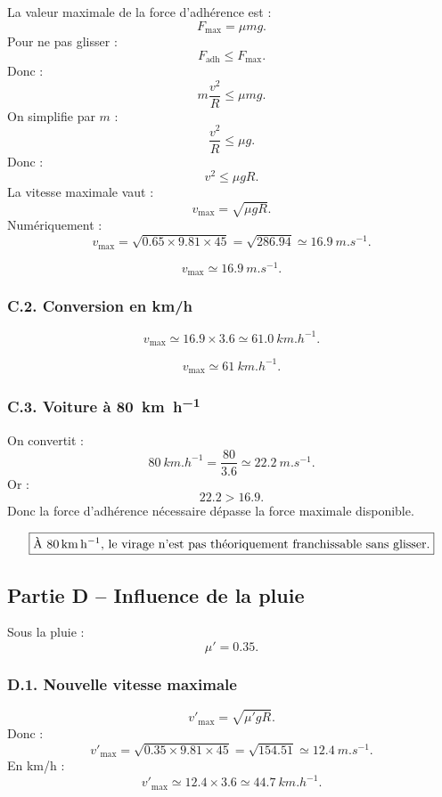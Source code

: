 \documentclass[11pt,a4paper]{article}
\begin{document}
La valeur maximale de la force d'adhérence est :
\[
F_{\max}=\mu mg.
\]
Pour ne pas glisser :
\[
F_{\text{adh}}\leq F_{\max}.
\]
Donc :
\[
m\frac{v^2}{R}\leq \mu mg.
\]
On simplifie par $m$ :
\[
\frac{v^2}{R}\leq \mu g.
\]
Donc :
\[
v^2\leq \mu gR.
\]
La vitesse maximale vaut :
\[
v_{\max}=\sqrt{\mu gR}.
\]
Numériquement :
\[
v_{\max}=\sqrt{0.65\times 9.81\times 45}
=\sqrt{286.94}
\simeq 16.9\ \si{m.s^{-1}}.
\]

\begin{resultatbox}
\[
\boxed{v_{\max}\simeq \SI{16.9}{m.s^{-1}}.}
\]
\end{resultatbox}

\subsubsection*{C.2. Conversion en km/h}

\[
v_{\max}\simeq 16.9\times 3.6\simeq 61.0\ \si{km.h^{-1}}.
\]

\begin{resultatbox}
\[
\boxed{v_{\max}\simeq \SI{61}{km.h^{-1}}.}
\]
\end{resultatbox}

\subsubsection*{C.3. Voiture à \SI{80}{km.h^{-1}}}

On convertit :
\[
80\ \si{km.h^{-1}}=\frac{80}{3.6}\simeq 22.2\ \si{m.s^{-1}}.
\]
Or :
\[
22.2>16.9.
\]
Donc la force d'adhérence nécessaire dépasse la force maximale disponible.

\begin{resultatbox}
\[
\boxed{\text{À \SI{80}{km.h^{-1}}, le virage n'est pas théoriquement franchissable sans glisser.}}
\]
\end{resultatbox}

\subsection{Partie D -- Influence de la pluie}

Sous la pluie :
\[
\mu'=0.35.
\]

\subsubsection*{D.1. Nouvelle vitesse maximale}

\[
v'_{\max}=\sqrt{\mu' gR}.
\]
Donc :
\[
v'_{\max}=\sqrt{0.35\times 9.81\times 45}
=\sqrt{154.51}
\simeq 12.4\ \si{m.s^{-1}}.
\]
En km/h :
\[
v'_{\max}\simeq 12.4\times 3.6\simeq 44.7\ \si{km.h^{-1}}.
\]
\end{document}
